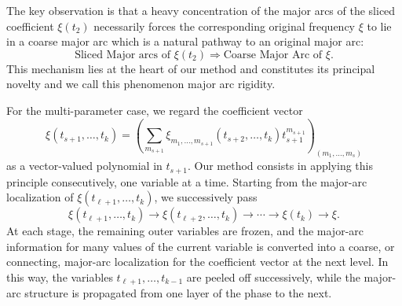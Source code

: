 \documentclass[11 pt,letterpaper]{amsart}
\theoremstyle{plain}
\theoremstyle{definition}
\theoremstyle{remark} \theoremstyle{exam} \theoremstyle{ob}
\numberwithin{equation}{section}
\begin{document}
 
 	
The key observation is that a heavy  concentration of the major arcs of the sliced coefficient $\xi(t_2)$ necessarily forces the corresponding original frequency $\xi$ to lie in a coarse major arc which is a natural pathway to an original major arc:
\[
\text{Sliced Major arcs of $\xi(t_2)$}
\Longrightarrow
\text{Coarse Major Arc of $\xi$.}
\]
This mechanism lies at the heart of our method and constitutes its principal novelty and we call this phenomenon  major arc rigidity.



For the multi-parameter case, we regard the coefficient vector
\[
\xi(t_{s+1},\ldots,t_k)
=
\left(
\sum_{m_{s+1}}
\xi_{m_1,\ldots,m_{s+1}}(t_{s+2},\ldots,t_k)
t_{s+1}^{m_{s+1}}
\right)_{(m_1,\ldots,m_s)}
\]
as a vector-valued polynomial in $t_{s+1}$.
Our method consists in applying this principle consecutively, one variable
at a time. Starting from the major-arc localization of
\(\xi(t_{\ell+1},\ldots,t_k)\), we successively pass
\[
\xi(t_{\ell+1},\ldots,t_k)
\longrightarrow
\xi(t_{\ell+2},\ldots,t_k)
\longrightarrow \cdots \longrightarrow
\xi(t_k)
\longrightarrow
\xi.
\]
At each stage, the remaining outer variables are frozen, and the
major-arc information for many values of the current variable is converted
into a coarse, or connecting, major-arc localization for the coefficient
vector at the next level. In this way, the variables
\(t_{\ell+1},\ldots,t_{k-1}\) are peeled off successively, while the
major-arc structure is propagated from one layer of the phase to the next.



 








 

 
\end{document}
